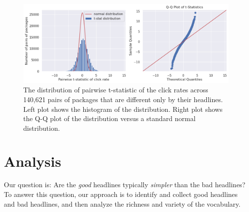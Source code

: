 \documentclass[%
preprint,
 amsmath,amssymb,
 aps,
]{revtex4-2}
\begin{document}
\begin{figure}
    \centering
    \includegraphics[width=\linewidth]{fig/stat4_pairwise_t-stat_hist.png}
    \caption{The distribution of pairwise t-statistic of the click rates across 140,621 pairs of packages that are different only by their headlines. Left plot shows the histogram of the distribution. Right plot shows the Q-Q plot of the distribution versus a standard normal distribution.}
    \label{fig:stat4_pairwise_t_stat}
\end{figure}

\section{Analysis}



Our question is: Are the \textit{good} headlines typically \textit{simpler} than the bad headlines?
To answer this question, our approach is to identify and collect good headlines and bad headlines, and then analyze the richness and variety of the vocabulary.

\end{document}
